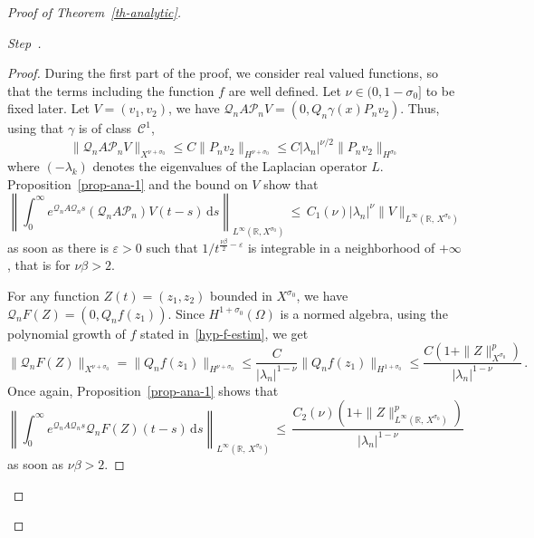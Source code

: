 \documentclass[AHL,Unicode,longabstracts]{cedram}
\newcommand{\RR}{\mathbb{R}}
\newcommand{\Cc}{\mathcal{C}}
\newcommand{\Pc}{\mathcal{P}}
\newcommand{\Qc}{\mathcal{Q}}
\newcommand{\drm}{\mathrm{d}}
\newcounter{stepcount}
\newenvironment{step}{\refstepcounter{stepcount}\begin{proof}[Step~\thestepcount]}{\let\qed\relax\end{proof}}
\begin{document}
\begin{proof}[{Proof of Theorem~\ref{th-analytic}}]
\begin{step}
\begin{proof}
During the first part of the proof, we consider real valued functions, so that the terms including the function $f$ are well defined. Let $\nu\in (0,1-\sigma_0]$ to be fixed later. Let $V=(v_1,v_2)$, we have $\Qc_n A\Pc_n V= (0,Q_n\gamma(x)P_n v_2)$. Thus, using that $\gamma$ is of class~$\Cc^1$,
\[
\|\Qc_n A \Pc_n V\|_{X^{\nu+\sigma_0}} \leq C \|P_n
v_2\|_{H^{\nu+\sigma_0}} \leq C |\lambda_n|^{\nu/2}\|P_n
v_2\|_{H^{\sigma_0}}
\]
where $(-\lambda_k)$ denotes the eigenvalues of the Laplacian operator $L$. Proposition~\ref{prop-ana-1} and the bound on $V$ show that
\begin{equation}\label{eq-demo-prop-W-1}
\left\| \int_0^\infty e^{\Qc_n A\Qc_n s}(\Qc_nA\Pc_n) V(t-s)\,\drm s\right\|_{L^\infty(\RR,X^{\sigma_0})}\,\leq\,C_1(\nu)|\lambda_n|^{\nu}\|V\|_{L^\infty(\RR,\,X^{\sigma_0})}
\end{equation}
as soon as there is $\varepsilon>0$ such that $1/t^{\frac{\nu\beta}{2}-\varepsilon}$ is integrable in a neighborhood of $+\infty$, that is for $\nu\beta>2$.

For any function $Z(t)=(z_1,z_2)$ bounded in $X^{\sigma_0}$, we have $\Qc_n F(Z)=(0,Q_n f(z_1))$. Since $H^{1+\sigma_0}(\Omega)$ is a normed algebra, using the polynomial growth of $f$ stated in~\eqref{hyp-f-estim}, we get
\[
\|\Qc_n F(Z)\|_{X^{\nu+\sigma_0}} = \|Q_n
f(z_1)\|_{H^{\nu+\sigma_0}}\leq \frac C {|\lambda_n|^{1-\nu}}
\|Q_n f(z_1)\|_{H^{1+\sigma_0}}\leq
\frac{C\left(1+\|Z\|_{X^{\sigma_0}}^p\right)}{|\lambda_n|^{1-\nu}}\,.
\]
Once again, Proposition~\ref{prop-ana-1} shows that
\begin{equation}\label{eq-demo-prop-W-2}
\left\| \int_0^\infty e^{\Qc_n A\Qc_n s}\Qc_n F(Z)(t-s)\,\drm s \right\|_{ L^\infty(\RR,\, X^{\sigma_0})}\,\leq\,\frac{C_2(\nu)\left(1+\|Z\|_{L^\infty(\RR,\,X^{\sigma_0}) }^p\right) } {|\lambda_n|^{ 1-\nu}}
\end{equation}
as soon as $\nu\beta>2$.


\end{proof}
\end{step}
\end{proof}
\end{document}
